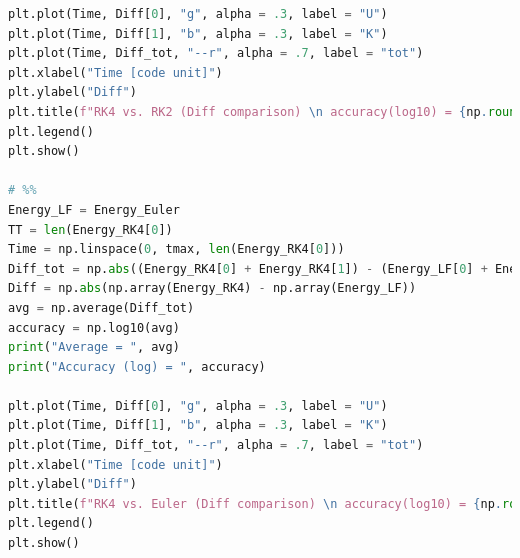 \documentclass[12pt]{article}
\begin{document}
\begin{lstlisting}[language={Python}]
plt.plot(Time, Diff[0], "g", alpha = .3, label = "U")
plt.plot(Time, Diff[1], "b", alpha = .3, label = "K")
plt.plot(Time, Diff_tot, "--r", alpha = .7, label = "tot")
plt.xlabel("Time [code unit]")
plt.ylabel("Diff")
plt.title(f"RK4 vs. RK2 (Diff comparison) \n accuracy(log10) = {np.round(accuracy, 5)}")
plt.legend()
plt.show()

# %%
Energy_LF = Energy_Euler
TT = len(Energy_RK4[0])
Time = np.linspace(0, tmax, len(Energy_RK4[0]))
Diff_tot = np.abs((Energy_RK4[0] + Energy_RK4[1]) - (Energy_LF[0] + Energy_LF[1]))
Diff = np.abs(np.array(Energy_RK4) - np.array(Energy_LF))
avg = np.average(Diff_tot)
accuracy = np.log10(avg)
print("Average = ", avg)
print("Accuracy (log) = ", accuracy)

plt.plot(Time, Diff[0], "g", alpha = .3, label = "U")
plt.plot(Time, Diff[1], "b", alpha = .3, label = "K")
plt.plot(Time, Diff_tot, "--r", alpha = .7, label = "tot")
plt.xlabel("Time [code unit]")
plt.ylabel("Diff")
plt.title(f"RK4 vs. Euler (Diff comparison) \n accuracy(log10) = {np.round(accuracy, 5)}")
plt.legend()
plt.show()

        \end{lstlisting}
\end{document}
